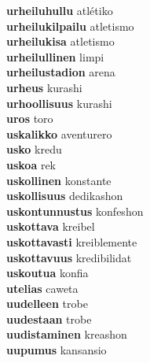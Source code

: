 \textbf{urheiluhullu } atlétiko \\
\textbf{urheilukilpailu } atletismo \\
\textbf{urheilukisa } atletismo \\
\textbf{urheilullinen } limpi \\
\textbf{urheilustadion } arena \\
\textbf{urheus } kurashi \\
\textbf{urhoollisuus } kurashi \\
\textbf{uros } toro \\
\textbf{uskalikko } aventurero \\
\textbf{usko } kredu \\
\textbf{uskoa } rek \\
\textbf{uskollinen } konstante \\
\textbf{uskollisuus } dedikashon \\
\textbf{uskontunnustus } konfeshon \\
\textbf{uskottava } kreibel \\
\textbf{uskottavasti } kreiblemente \\
\textbf{uskottavuus } kredibilidat \\
\textbf{uskoutua } konfia \\
\textbf{utelias } caweta \\
\textbf{uudelleen } trobe \\
\textbf{uudestaan } trobe \\
\textbf{uudistaminen } kreashon \\
\textbf{uupumus } kansansio \\
